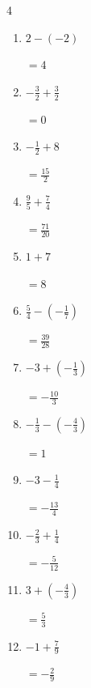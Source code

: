 \begin{multicols}{4}
\begin{enumerate}
        $\displaystyle =-\frac{2}{9}$

  \item $\displaystyle 2 - \left(-2\right)$

        $\displaystyle =4$

  \item $\displaystyle -\frac{3}{2} + \frac{3}{2}$

        $\displaystyle =0$

  \item $\displaystyle -\frac{1}{2} + 8$

        $\displaystyle =\frac{15}{2}$

  \item $\displaystyle \frac{9}{5} + \frac{7}{4}$

        $\displaystyle =\frac{71}{20}$

  \item $\displaystyle 1 + 7$

        $\displaystyle =8$

  \item $\displaystyle \frac{5}{4} - \left(-\frac{1}{7}\right)$

        $\displaystyle =\frac{39}{28}$

  \item $\displaystyle -3 + \left(-\frac{1}{3}\right)$

        $\displaystyle =-\frac{10}{3}$

  \item $\displaystyle -\frac{1}{3} - \left(-\frac{4}{3}\right)$

        $\displaystyle =1$

  \item $\displaystyle -3 - \frac{1}{4}$

        $\displaystyle =-\frac{13}{4}$

\columnbreak %

  \item $\displaystyle -\frac{2}{3} + \frac{1}{4}$

        $\displaystyle =-\frac{5}{12}$

  \item $\displaystyle 3 + \left(-\frac{4}{3}\right)$

        $\displaystyle =\frac{5}{3}$

  \item $\displaystyle -1 + \frac{7}{9}$

        $\displaystyle =-\frac{2}{9}$


\end{enumerate}
\end{multicols}

